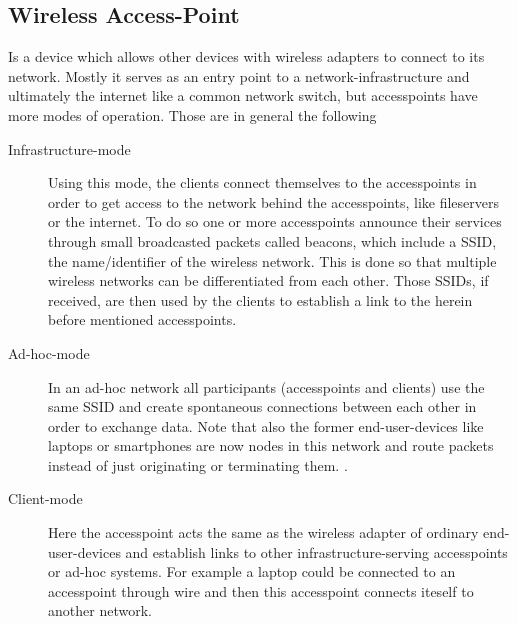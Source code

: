   \subsection{Wireless Access-Point}
    Is a device which allows other devices with wireless adapters to connect to its network.
    Mostly it serves as an entry point to a network-infrastructure and ultimately the internet like a common network switch, 
    but accesspoints have more modes of operation. Those are in general the following
    \begin{description}
      \item[Infrastructure-mode]
	Using this mode, the clients connect themselves to the accesspoints in order to get access to the network behind the accesspoints, like fileservers or the internet.
	To do so one or more accesspoints announce their services through small broadcasted packets called beacons, which include a \ac{SSID}, 
	the name/identifier of the wireless network. This is done 
	so that multiple wireless networks can be differentiated from each other. Those SSIDs, if received, are then used by the clients to
	establish a link to the herein before mentioned accesspoints.
      \item [Ad-hoc-mode]
	In an ad-hoc network all participants (accesspoints and clients) use the same \ac{SSID} and create spontaneous connections between each other in order to 
	exchange data. Note that also the former end-user-devices like laptops or smartphones are now nodes in this network and route packets instead of just originating or
	terminating them. \cite{Akyildiz2005445}.
     \item [Client-mode]
	Here the accesspoint acts the same as the wireless adapter of ordinary end-user-devices and establish links to other infrastructure-serving accesspoints or 
	ad-hoc systems. For example a laptop could be connected to an accesspoint through wire and then this accesspoint connects iteself to another network.
    \end{description}
    
